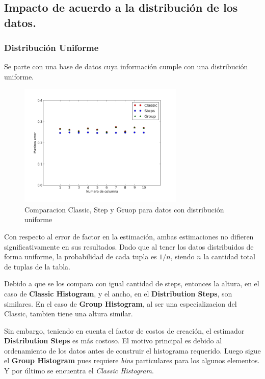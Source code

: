\documentclass[10pt, a4paper,english,spanish,hidelinks]{article}
\begin{document}
\subsection{Impacto de acuerdo a la distribución de los datos.}
\subsubsection{Distribución Uniforme}

Se parte con una base de datos cuya información cumple con una distribución uniforme.

\begin{figure}[h!]
  \centering
  \includegraphics[width=0.7\textwidth]{./imagenes/ejb3_uniforme.png}
  \caption{Comparacion Classic, Step y Gruop para datos con distribución uniforme}
\end{figure}

\newpage
Con respecto al error de factor en la estimación, ambas estimaciones no difieren
significativamente en sus resultados. Dado que al tener los datos distribuidos de forma
uniforme, la probabilidad de cada tupla es $1/n$, siendo $n$ la cantidad total de tuplas de la tabla.

Debido a que se los compara con igual cantidad de steps, entonces la altura, en el caso de
\textbf{Classic Histogram}, y el ancho, en el \textbf{Distribution Steps}, son similares.
En el caso de \textbf{Group Histogram}, al ser una especializacion del Classic, tambien tiene
una altura similar.

Sin embargo, teniendo en cuenta el factor de costos de creación, el estimador
\textbf{Distribution Steps} es más costoso. El motivo principal es debido al ordenamiento
de los datos antes de construir el histograma requerido. Luego sigue el \textbf{Group Histogram}
pues requiere \textit{bins} particulares para los algunos elementos. Y por último se encuentra el \textit{Classic Histogram}.
\end{document}
